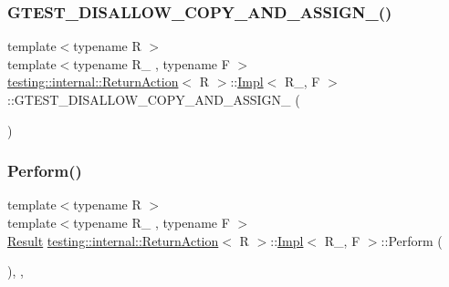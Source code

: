 \subsubsection{\texorpdfstring{GTEST\_DISALLOW\_COPY\_AND\_ASSIGN\_()}{GTEST\_DISALLOW\_COPY\_AND\_ASSIGN\_()}\hspace{0.1cm}{\footnotesize\ttfamily [3/3]}}
{\footnotesize\ttfamily template$<$typename R $>$ \\
template$<$typename R\+\_\+ , typename F $>$ \\
\mbox{\hyperlink{classtesting_1_1internal_1_1_return_action}{testing\+::internal\+::\+Return\+Action}}$<$ R $>$\+::\mbox{\hyperlink{classtesting_1_1internal_1_1_return_action_1_1_impl}{Impl}}$<$ R\+\_\+, F $>$\+::G\+T\+E\+S\+T\+\_\+\+D\+I\+S\+A\+L\+L\+O\+W\+\_\+\+C\+O\+P\+Y\+\_\+\+A\+N\+D\+\_\+\+A\+S\+S\+I\+G\+N\+\_\+ (\begin{DoxyParamCaption}\item[{\mbox{\hyperlink{classtesting_1_1internal_1_1_return_action_1_1_impl}{Impl}}$<$ R\+\_\+, F $>$}]{ }\end{DoxyParamCaption})\hspace{0.3cm}{\ttfamily [private]}}

\mbox{\label{classtesting_1_1internal_1_1_return_action_1_1_impl_a75639b38ed9daff7f07099a7703018ad}} 
\subsubsection{\texorpdfstring{Perform()}{Perform()}\hspace{0.1cm}{\footnotesize\ttfamily [1/3]}}
{\footnotesize\ttfamily template$<$typename R $>$ \\
template$<$typename R\+\_\+ , typename F $>$ \\
\mbox{\hyperlink{classtesting_1_1_action_interface_a7477de2fe3e4e01c59db698203acaee7}{Result}} \mbox{\hyperlink{classtesting_1_1internal_1_1_return_action}{testing\+::internal\+::\+Return\+Action}}$<$ R $>$\+::\mbox{\hyperlink{classtesting_1_1internal_1_1_return_action_1_1_impl}{Impl}}$<$ R\+\_\+, F $>$\+::Perform (\begin{DoxyParamCaption}\item[{const \mbox{\hyperlink{classtesting_1_1_action_interface_af72720d864da4d606629e83edc003511}{Argument\+Tuple}} \&}]{ }\end{DoxyParamCaption})\hspace{0.3cm}{\ttfamily [inline]}, {\ttfamily [override]}, {\ttfamily [virtual]}}



